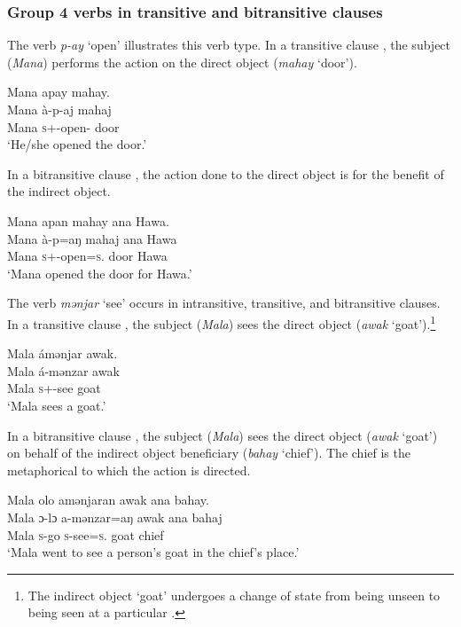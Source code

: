 \subsubsection{Group 4 verbs in transitive and bitransitive clauses}\label{sec:9.2.4.1}

The verb \textit{p-ay} ‘open’ illustrates this verb type. In a transitive clause , the subject (\textit{Mana}) performs the action on the direct object (\textit{mahay} ‘door’). 


\ea \label{ex:9:15}
Mana  apay  mahay.\\
\gll  Mana   à-p-aj    mahaj\\
      Mana  \textsc{s}+{\PFV}-open{}-{\CL}  door\\
\glt  ‘He/she opened the door.’ 
\z

In a bitransitive clause , the action done to the direct object is for the benefit of the indirect object.

\ea \label{ex:9:16}
Mana  apan  mahay  ana  Hawa.\\
\gll  Mana   à-p=aŋ      mahaj  ana  Hawa\\
      Mana  \textsc{s}+{\PFV}-open=\textsc{s}.{\IO}  door  {\DAT} Hawa\\
\glt  ‘Mana opened the door for Hawa.’ 
\z

The verb \textit{mənjar} ‘see’ occurs in intransitive, transitive, and bitransitive clauses. In a transitive clause , the subject (\textit{Mala}) sees the direct object (\textit{awak} ‘goat’).\footnote{The indirect object ‘goat’ undergoes a change of state from being unseen to being seen at a particular \LOC.} 

\ea \label{ex:9:17}
Mala  ámənjar  awak.\\
\gll  Mala á-mənzar   awak\\
      Mala  \textsc{s}+{\IFV}-see  goat\\
\glt  ‘Mala sees a goat.’{ }
\z

In a bitransitive clause , the subject (\textit{Mala}) sees the direct object (\textit{awak} ‘goat’) on behalf of the indirect object beneficiary (\textit{bahay} ‘chief’). The chief is the metaphorical \LOC to which the action is directed.

\ea \label{ex:9:18}
Mala  olo  amənjaran  awak  ana  bahay.\\
\gll  Mala  ɔ{}-lɔ    a-mənzar=aŋ  awak  ana  bahaj\\
      Mala  \textsc{s}-go  \textsc{s}-see=\textsc{s}.{\IO}  goat  {\DAT} chief\\
\glt  ‘Mala went to see a person’s goat in the chief’s place.’{ }
\z

